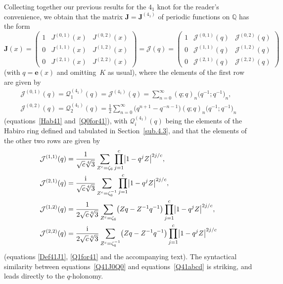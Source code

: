 \documentclass[pdftex]{sigma}
\numberwithin{equation}{section}
\def\BQ{\mathbb Q}
\def\z{\zeta}
\def\e{\mathbf{e}}
\def\m{ - }
\def\i{^{-1}}
\def\e{\mathbf{e}}
\def\z{\zeta}
\def\J{\mathbf J} \def\J{J} %
\def\sQ{\mathcal{Q}}
\def\bJ{J} \def\bJ{\mathbf{J}}
\def\sJ{\mathcal{J}}
\begin{document}
Collecting together our previous results for the $4_1$ knot for the reader's convenience,
we obtain that the matrix $\bJ=\bJ^{(4_1)}$ of periodic functions on $\BQ$ has the form
\[%
\bJ(x) = \begin{pmatrix}
 1 & \J^{(0,1)}(x) & \J^{(0,2)}(x) \\
 0 & \J^{(1,1)}(x) & \J^{(1,2)}(x) \\
 0 & \J^{(2,1)}(x) & \J^{(2,2)}(x)
\end{pmatrix}
 =\sJ(q) = \begin{pmatrix}
 1 & \sJ^{(0,1)}(q) & \sJ^{(0,2)}(q) \\
 0 & \sJ^{(1,1)}(q) & \sJ^{(1,2)}(q) \\
 0 & \sJ^{(2,1)}(q) & \sJ^{(2,2)}(q)
\end{pmatrix}
\]
(with $q=\e(x)$ and omitting~$K$ as usual), where the elements of the first
row are given by
\begin{gather}
 \sJ^{(0,1)}(q) =\sQ^{(4_1)}_1(q)=\sJ^{(4_1)}(q)
 = \sum_{n=0}^\infty (q;q)_n \big(q^{-1};q^{-1}\big)_n ,\nonumber\\
 \sJ^{(0,2)}(q) =\sQ^{(4_1)}_2(q)
 =\frac{1}{2}\sum_{n=0}^\infty \big(q^{n+1}-q^{-n-1}\big) (q;q)_n \big(q^{-1};q^{-1}\big)_n\label{Q41J0Q0}
\end{gather}
(equations~\eqref{Hab41} and~\eqref{Q0for41}), with $\sQ^{(4_1)}_i(q)$ being
the elements of the Habiro ring defined and tabulated in Section~\ref{sub.4.3},
and that the elements of the other two rows are given by
\begin{align}
\sJ^{(1,1)}(q) &= \frac{1}{\sqrt{c}\sqrt[4]{3}} \sum_{Z^c = \z_6}
 \prod_{j=1}^c \bigl|1\m q^jZ\bigr|^{2j/c} ,\nonumber\\
\sJ^{(2,1)}(q) &= \frac{\rm i}{\sqrt{c}\sqrt[4]{3}}  \sum_{Z^c = \z_6^{-1}}
 \prod_{j=1}^c \bigl|1\m q^jZ\bigr|^{2j/c} ,\nonumber\\
\sJ^{(1,2)}(q) &= \frac{1}{2\sqrt{c} \sqrt[4]{3}}
\sum_{Z^c = \z_6} \bigl(Zq\m Z\i q\i\bigr) \prod_{j=1}^c \bigl|1\m q^jZ\bigr|^{2j/c},\nonumber
\\
\sJ^{(2,2)}(q) &= \frac{\rm i}{2\sqrt c \sqrt[4]{3}}
\sum_{Z^c = \z_6^{-1}} \bigl(Zq\m Z\i q\i\bigr)
\prod_{j=1}^c \bigl|1\m q^jZ\bigr|^{2j/c}\label{Q41abcd}
\end{align}
(equations \eqref{Def41J1}, \eqref{Q1for41} and the accompanying text).
The syntactical similarity between equations~\eqref{Q41J0Q0} and
equations~\eqref{Q41abcd} is striking, and leads directly to the $q$-holonomy.
\end{document}
